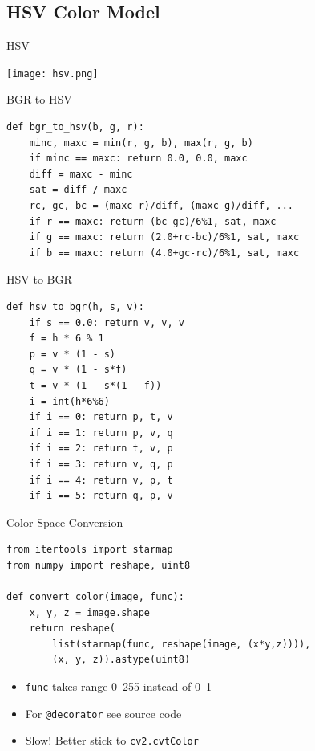 \documentclass[pdf]{beamer}
\begin{document}
\subsection{HSV Color Model}
\begin{frame}{HSV}
\begin{center}
  \texttt{[image: hsv.png]}
\end{center}
\end{frame}

\begin{frame}[fragile]{BGR to HSV}
\begin{verbatim}
def bgr_to_hsv(b, g, r):
    minc, maxc = min(r, g, b), max(r, g, b)
    if minc == maxc: return 0.0, 0.0, maxc
    diff = maxc - minc
    sat = diff / maxc
    rc, gc, bc = (maxc-r)/diff, (maxc-g)/diff, ...
    if r == maxc: return (bc-gc)/6%1, sat, maxc
    if g == maxc: return (2.0+rc-bc)/6%1, sat, maxc
    if b == maxc: return (4.0+gc-rc)/6%1, sat, maxc
\end{verbatim}
\end{frame}

\begin{frame}[fragile]{HSV to BGR}
\begin{verbatim}
def hsv_to_bgr(h, s, v):
    if s == 0.0: return v, v, v
    f = h * 6 % 1
    p = v * (1 - s)
    q = v * (1 - s*f)
    t = v * (1 - s*(1 - f))
    i = int(h*6%6)
    if i == 0: return p, t, v
    if i == 1: return p, v, q
    if i == 2: return t, v, p
    if i == 3: return v, q, p
    if i == 4: return v, p, t
    if i == 5: return q, p, v
\end{verbatim}
\end{frame}

\begin{frame}[fragile]{Color Space Conversion}
\begin{verbatim}
from itertools import starmap
from numpy import reshape, uint8

def convert_color(image, func):
    x, y, z = image.shape
    return reshape(
        list(starmap(func, reshape(image, (x*y,z)))),
        (x, y, z)).astype(uint8)
\end{verbatim}

  \begin{itemize}
    \item \verb|func| takes range 0--255 instead of 0--1
    \item For \verb|@decorator| see source code
    \item Slow!  Better stick to \verb|cv2.cvtColor|
  \end{itemize}
\end{frame}
\end{document}
